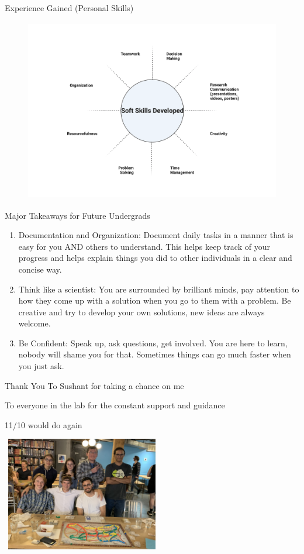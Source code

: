 \documentclass{beamer}
\begin{document}
	\begin{frame}{Experience Gained (Personal Skills)}
		\begin{figure}
			\includegraphics[width=\textwidth,height=8cm]{soft_skills_gained.png}
		\end{figure}
	\end{frame}

	\begin{frame}{Major Takeaways for Future Undergrads}
		\begin{enumerate}
			\item Documentation and Organization: Document daily tasks in a manner that is easy for you AND others to understand. This helps keep track of your progress and helps explain things you did to other individuals in a clear and concise way.
			\item Think like a scientist: You are surrounded by brilliant minds, pay attention to how they come up with a solution when you go to them with a problem. Be creative and try to develop your own solutions, new ideas are always welcome.
			\item Be Confident: Speak up, ask questions, get involved. You are here to learn, nobody will shame you for that. Sometimes things can go much faster when you just ask.
		\end{enumerate}
	\end{frame}

	\begin{frame}{Thank You}
		To Sushant for taking a chance on me
		
		To everyone in the lab for the constant support and guidance
		
		11/10 would do again
		
		\begin{center}
			\includegraphics[width=7cm, height=5cm]{lab.jpg}
		\end{center}
	\end{frame}	
\end{document}
